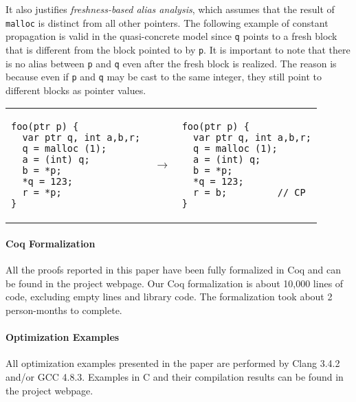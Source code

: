 It also justifies %
\textit{freshness-based alias analysis}, which assumes that the result of
\texttt{malloc} is distinct from all other pointers.  The 
following example of constant propagation is valid in the
quasi-concrete model since \texttt{q} points to a fresh block that
is different from the block pointed to by \texttt{p}.
It is important to note that there is no alias
between \texttt{p} and \texttt{q} even after
the fresh block is realized. The reason is because
even if \texttt{p} and \texttt{q} may be cast to the same integer,
they still point to different blocks as pointer values.
\begin{center}
\begin{tabular}{@{}l@{}l@{~~}l}
\begin{lstlisting}
foo(ptr p) {
  var ptr q, int a,b,r;
  q = malloc (1);
  a = (int) q;
  b = *p;
  *q = 123;
  r = *p;
}
\end{lstlisting}
&
$~\rightarrow$
&
\begin{lstlisting}
foo(ptr p) {
  var ptr q, int a,b,r;
  q = malloc (1);
  a = (int) q;
  b = *p;
  *q = 123;
  r = b;         // CP
}
\end{lstlisting}
\end{tabular}
\end{center}


\paragraph{Coq Formalization}
All the proofs reported in this paper have been fully formalized in
Coq and can be found in the project webpage.  Our Coq formalization is about 10,000 lines of code,
excluding empty lines and library code.  The formalization took about 2
person-months to complete.

\paragraph{Optimization Examples}
All optimization examples presented in the paper are performed by Clang
3.4.2 and/or GCC 4.8.3.  Examples in C and their compilation
results can be found in the project webpage.

